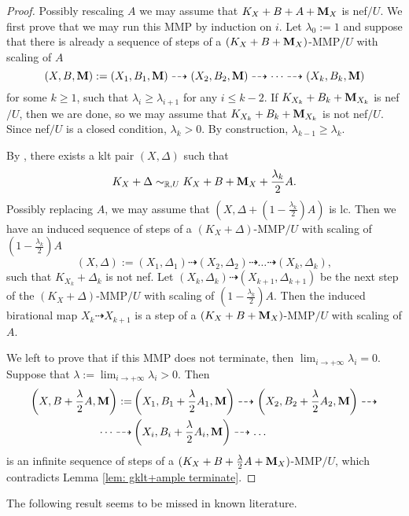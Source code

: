 \documentclass[11pt]{amsart}
\numberwithin{equation}{section}
\newcommand{\Mm}{{\bf{M}}}
\theoremstyle{definition}
\theoremstyle{definition}
\theoremstyle{definition}
\begin{document}
\begin{proof}
Possibly rescaling $A$ we may assume that $K_X+B+A+\Mm_X$ is nef$/U$. We first prove that we may run this MMP by induction on $i$. Let $\lambda_0:=1$ and suppose that there is already a sequence of steps of a $(K_X+B+\Mm_X)$-MMP$/U$ with scaling of $A$
$$(X,B,\Mm):=(X_1,B_1,\Mm)\dashrightarrow (X_2,B_2,\Mm)\dashrightarrow\dots\dashrightarrow (X_k,B_k,\Mm)$$
for some $k\ge1$, such that $\lambda_i\geq\lambda_{i+1}$ for any $i\leq k-2$. If $K_{X_k}+B_k+\Mm_{X_k}$ is nef$/U$, then we are done, so we may assume that $K_{X_k}+B_k+\Mm_{X_k}$ is not nef$/U$. Since nef$/U$ is a closed condition, $\lambda_k>0$. By construction, $\lambda_{k-1}\geq\lambda_{k}$.

By \cite[Lemma 3.4]{HL22}, there exists a klt pair $(X,\Delta)$ such that 
$$K_X+\Delta\sim_{\mathbb R,U}K_X+B+\Mm_X+\frac{\lambda_k}{2}A.$$ 
Possibly replacing $A$, we may assume that $(X,\Delta+(1-\frac{\lambda_k}{2})A)$ is lc. Then we have an induced sequence of steps of a $(K_X+\Delta)$-MMP$/U$ with scaling of $(1-\frac{\lambda_k}{2})A$
$$(X,\Delta):=(X_1,\Delta_1)\dashrightarrow (X_2,\Delta_2)\dashrightarrow\dots\dashrightarrow (X_k,\Delta_k),$$
such that $K_{X_k}+\Delta_k$ is not nef. Let $(X_k,\Delta_k)\dashrightarrow (X_{k+1},\Delta_{k+1})$ be the next step of the $(K_X+\Delta)$-MMP$/U$ with scaling of $(1-\frac{\lambda_k}{2})A$. Then the induced birational map $X_k\dashrightarrow X_{k+1}$ is a step of a $(K_X+B+\Mm_X)$-MMP$/U$ with scaling of $A$. 

We left to prove that if this MMP does not terminate, then $\lim_{i\rightarrow+\infty}\lambda_i=0$. Suppose that $\lambda:=\lim_{i\rightarrow+\infty}\lambda_i>0$. Then
\begin{align*}
\left(X,B+\frac{\lambda}{2}A,\Mm\right):=&\left(X_1,B_1+\frac{\lambda}{2}A_1,\Mm\right)\dashrightarrow\left(X_2,B_2+\frac{\lambda}{2}A_2,\Mm\right)\dashrightarrow\\
\dots\dashrightarrow&\left(X_i,B_i+\frac{\lambda}{2}A_i,\Mm\right)\dashrightarrow\dots
\end{align*}
is an infinite sequence of steps of a $(K_X+B+\frac{\lambda}{2}A+\Mm_X)$-MMP$/U$, which contradicts Lemma \ref{lem: gklt+ample terminate}.
\end{proof}


The following result seems to be missed in known literature.
\end{document}
